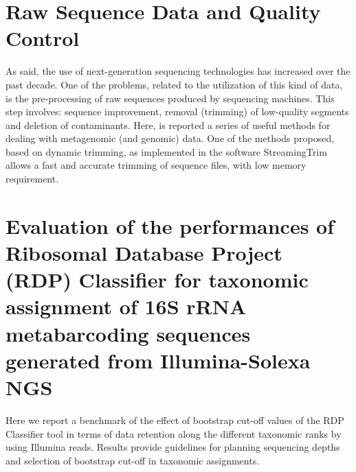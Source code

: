 \section{Raw Sequence Data and Quality Control}
As said, the use of next-generation sequencing technologies has increased over the past decade. One of the problems, related to the utilization of this kind of data, is the pre-processing of raw sequences produced by sequencing machines. This step involves: sequence improvement, removal (trimming) of low-quality segments and deletion of contaminants. Here, is reported a series of useful methods for dealing with metagenomic (and genomic) data. One of the methods proposed, based on dynamic trimming, as implemented in the software StreamingTrim allows a fast and accurate trimming of sequence files, with low memory requirement.\\
\newpage

\newpage

\section{Evaluation of the performances of Ribosomal Database Project (RDP) Classifier for taxonomic assignment of 16S rRNA metabarcoding sequences generated from Illumina-Solexa NGS}
Here we report a benchmark of the effect of bootstrap cut-off values of the RDP Classifier tool in terms of data retention along the different taxonomic ranks by using Illumina reads. Results provide guidelines for planning sequencing depths and selection of bootstrap cut-off in taxonomic assignments.\\

